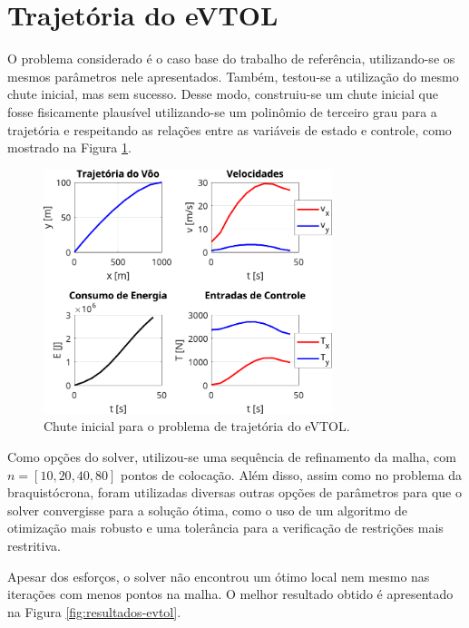 \section{Trajetória do eVTOL}
\label{sec:resultados-evtol}

O problema considerado é o caso base do trabalho de referência, utilizando-se os mesmos parâmetros nele apresentados. Também, testou-se a utilização do mesmo chute inicial, mas sem sucesso. Desse modo, construiu-se um chute inicial que fosse fisicamente plausível utilizando-se um polinômio de terceiro grau para a trajetória e respeitando as relações entre as variáveis de estado e controle, como mostrado na Figura \ref{fig:resultados-evtol-chute}.

\begin{figure}[H]
    \centering
    \includegraphics[width=0.75\textwidth]{Cap4/figuras/evtol-chute.pdf}
    \caption{Chute inicial para o problema de trajetória do eVTOL.}
    \label{fig:resultados-evtol-chute}
\end{figure}

Como opções do solver, utilizou-se uma sequência de refinamento da malha, com $n=[10, 20, 40, 80]$ pontos de colocação. Além disso, assim como no problema da braquistócrona, foram utilizadas diversas outras opções de parâmetros para que o solver convergisse para a solução ótima, como o uso de um algoritmo de otimização mais robusto e uma tolerância para a verificação de restrições mais restritiva.

Apesar dos esforços, o solver não encontrou um ótimo local nem mesmo nas iterações com menos pontos na malha. O melhor resultado obtido é apresentado na Figura \ref{fig:resultados-evtol}.

